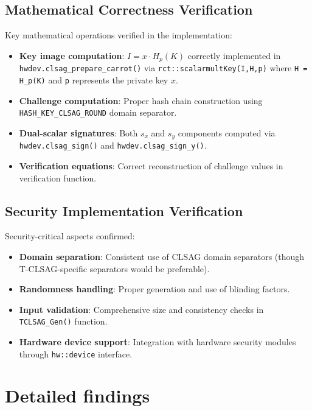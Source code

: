 \documentclass{article}
\begin{document}
\subsection{Mathematical Correctness Verification}
Key mathematical operations verified in the implementation:
\begin{itemize}
  \item \textbf{Key image computation}: $I = x \cdot H_p(K)$ correctly implemented 
        in \texttt{hwdev.clsag\_prepare\_carrot()} via \texttt{rct::scalarmultKey(I,H,p)} 
        where \texttt{H = H\_p(K)} and \texttt{p} represents the private key $x$.
  \item \textbf{Challenge computation}: Proper hash chain construction using \\
        \texttt{HASH\_KEY\_CLSAG\_ROUND} domain separator.
  \item \textbf{Dual-scalar signatures}: Both $s_x$ and $s_y$ components computed 
        via \texttt{hwdev.clsag\_sign()} and \texttt{hwdev.clsag\_sign\_y()}.
  \item \textbf{Verification equations}: Correct reconstruction of challenge values 
        in verification function.
\end{itemize}

\subsection{Security Implementation Verification}
Security-critical aspects confirmed:
\begin{itemize}
  \item \textbf{Domain separation}: Consistent use of CLSAG domain separators 
        (though T-CLSAG-specific separators would be preferable).
  \item \textbf{Randomness handling}: Proper generation and use of blinding factors.
  \item \textbf{Input validation}: Comprehensive size and consistency checks in \\
        \texttt{TCLSAG\_Gen()} function.
  \item \textbf{Hardware device support}: Integration with hardware security modules 
        through \texttt{hw::device} interface.
\end{itemize}

\section{Detailed findings}
\end{document}
